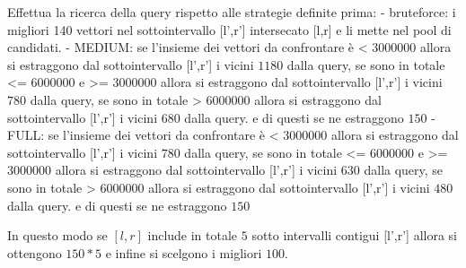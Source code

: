   Effettua la ricerca della query rispetto alle strategie definite prima:
    - bruteforce: i migliori 140 vettori nel sottointervallo [l',r'] intersecato [l,r]
    e li mette nel pool di candidati.
    - MEDIUM: se l'insieme dei vettori da confrontare è < 3000000 allora si estraggono 
    dal sottointervallo [l',r'] i vicini $1180$ dalla query, se sono in totale <= 6000000 e >=  3000000
    allora si estraggono dal sottointervallo [l',r'] i vicini $780$ dalla query, 
    se sono in totale > 6000000 allora si estraggono dal sottointervallo [l',r'] i vicini $680$ dalla query.
    e di questi se ne estraggono $150$
    - FULL: se l'insieme dei vettori da confrontare è < 3000000 allora si estraggono 
    dal sottointervallo [l',r'] i vicini $780$ dalla query, se sono in totale <= 6000000 e >=  3000000
    allora si estraggono dal sottointervallo [l',r'] i vicini $630$ dalla query, 
    se sono in totale > 6000000 allora si estraggono dal sottointervallo [l',r'] i vicini $480$ dalla query.
    e di questi se ne estraggono $150$
  
  In questo modo se $[l,r]$ include in totale $5$ sotto intervalli contigui [l',r']
  allora si ottengono $150*5$ e infine si scelgono i migliori $100$.